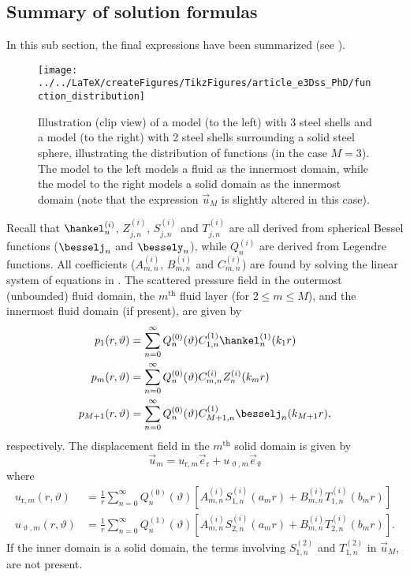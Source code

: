 \subsection{Summary of solution formulas}
In this sub section, the final expressions have been summarized (see ).
\begin{figure}
	\centering
	\texttt{[image: ../../LaTeX/createFigures/TikzFigures/article\_e3Dss\_PhD/function\_distribution]}
	\caption{Illustration (clip view) of a model (to the left) with 3 steel shells and a model (to the right) with 2 steel shells surrounding a solid steel sphere, illustrating the distribution of functions (in the case $M=3$). The model to the left models a fluid as the innermost domain, while the model to the right models a solid domain as the innermost domain (note that the expression $\vec{u}_M$ is slightly altered in this case).}
	\label{Fig1:function_distribution}
\end{figure}
Recall that $\hankel_n^{(i)}$, $Z_{j,n}^{(i)}$, $S_{j,n}^{(i)}$ and $T_{j,n}^{(i)}$ are all derived from spherical Bessel functions ($\besselj_n$ and $\bessely_n$), while $Q_n^{(i)}$ are derived from Legendre functions. All coefficients ($A_{m,n}^{(i)}$, $B_{m,n}^{(i)}$ and $C_{m,n}^{(i)}$) are found by solving the linear system of equations in . The scattered pressure field in the outermost (unbounded) fluid domain, the $m^{\mathrm{th}}$ fluid layer (for $2\leq m \leq M$), and the innermost fluid domain (if present), are given by
\begin{align}\label{Eq1:Summary_p1}
p_1(r,\vartheta) &= \sum_{n=0}^\infty Q_n^{(0)}(\vartheta) C_{1,n}^{(1)} \hankel^{(1)}_n(k_1 r)\\\label{Eq1:Summary_pm}
p_m(r,\vartheta) &= \sum_{n=0}^\infty Q_n^{(0)}(\vartheta)C_{m,n}^{(i)} Z_n^{(i)}(k_m r)\\
	p_{M+1}(r,\vartheta) &= \sum_{n=0}^\infty Q_n^{(0)}(\vartheta) C_{M+1,n}^{(1)} \besselj_n(k_{M+1} r),\label{Eq1:Summary_pM1}
\end{align}
respectively. The displacement field in the $m^{\mathrm{th}}$ solid domain is given by
\begin{equation}
	\vec{u}_m = u_{\mathrm{r},m} \vec{e}_{\mathrm{r}} + u_{\upvartheta,m} \vec{e}_\upvartheta\label{Eq1:Summary_u}
\end{equation}
where
\begin{align}
	u_{\mathrm{r},m}(r,\vartheta) &= \frac{1}{r}\sum_{n=0}^\infty Q_n^{(0)}(\vartheta)\left[A_{m,n}^{(i)}S_{1,n}^{(i)}(a_m r)+B_{m,n}^{(i)}T_{1,n}^{(i)}(b_m r)\right]\\
	u_{\upvartheta,m}(r,\vartheta) &= \frac{1}{r}\sum_{n=0}^\infty Q_n^{(1)}(\vartheta)\left[A_{m,n}^{(i)}S_{2,n}^{(i)}(a_m r)+B_{m,n}^{(i)}T_{2,n}^{(i)}(b_m r)\right].
\end{align} 
If the inner domain is a solid domain, the terms involving $S_{1,n}^{(2)}$ and $T_{1,n}^{(2)}$ in $\vec{u}_M$, are not present.